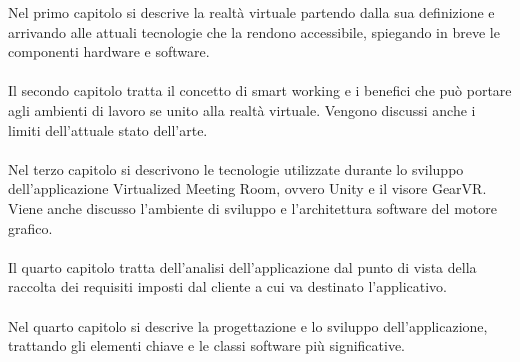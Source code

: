 Nel primo capitolo si descrive la realtà virtuale partendo dalla sua definizione e arrivando alle attuali tecnologie che la rendono accessibile, spiegando in breve le componenti hardware e software.\\
\\
Il secondo capitolo tratta il concetto di smart working e i benefici che può portare agli ambienti di lavoro se unito alla realtà virtuale. Vengono discussi anche i limiti dell'attuale stato dell'arte.\\
\\
Nel terzo capitolo si descrivono le tecnologie utilizzate durante lo sviluppo dell'applicazione Virtualized Meeting Room, ovvero Unity e il visore GearVR. Viene anche discusso l'ambiente di sviluppo e l'architettura software del motore grafico.\\
\\
Il quarto capitolo tratta dell'analisi dell'applicazione dal punto di vista della raccolta dei requisiti imposti dal cliente a cui va destinato l'applicativo.\\
\\
Nel quarto capitolo si descrive la progettazione e lo sviluppo dell'applicazione, trattando gli elementi chiave e le classi software più significative.  

